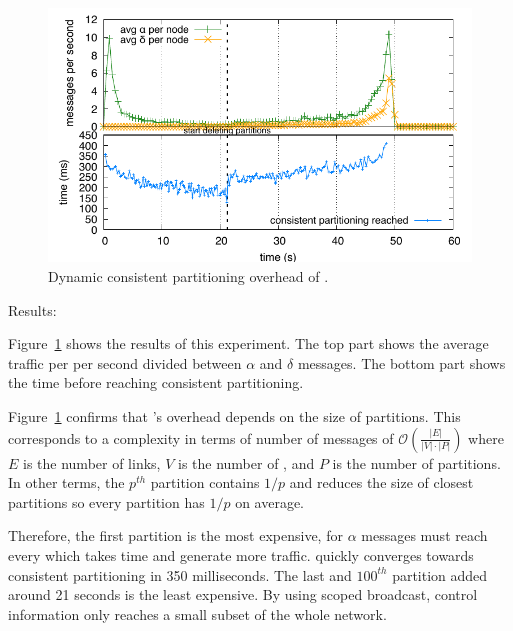 \begin{asparadesc}
\begin{figure}[t]
  \centering\includegraphics[width=\FIGSCALE\columnwidth]{img/as_cast_complexity.pdf}
  \caption{\label{fig:complexity}Dynamic consistent partitioning overhead of \NAME.}
  
\end{figure}

\item [Results:]

Figure~\ref{fig:complexity} shows the results of this experiment. The
top part shows the average traffic per \process per second divided
between $\alpha$ and $\delta$ messages. The bottom part shows the time
before reaching consistent partitioning.

\noindent Figure~\ref{fig:complexity} confirms that \NAME's overhead
depends on the size of partitions. %
This %
corresponds to a complexity in terms of number of messages of
$\mathcal{O}(\frac{|E|}{|V|\cdot|P|})$ where $E$ is the number of
links, $V$ is the number of \processes, and $P$ is the number of
partitions. In other terms, the $p^{th}$ partition contains $1/p$
\processes and reduces the size of closest partitions so every
partition has $1/p$ \processes on average.
  
\noindent Therefore, the first partition is the most expensive, for
$\alpha$ messages must reach every \process which takes time and
generate more traffic.  \NAME quickly converges towards consistent
partitioning in 350 milliseconds.
The last and $100^{th}$ partition
added around 21 seconds is the least expensive. By using scoped
broadcast, control information only reaches a small subset of the
whole network.


\end{asparadesc}
